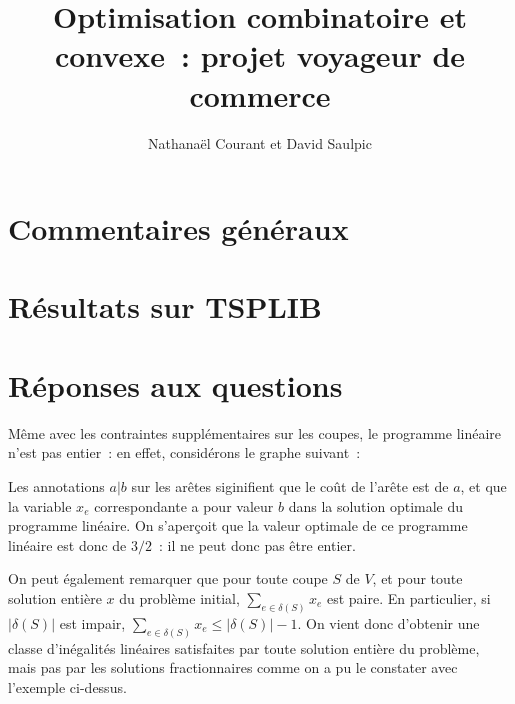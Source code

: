 \documentclass[a4paper,10pt]{article}
\title{Optimisation combinatoire et convexe~: projet voyageur de commerce}
\author{Nathanaël Courant et David Saulpic}
\date{}
\begin{document}
\maketitle

\section{Commentaires généraux}

\section{Résultats sur TSPLIB}

\section{Réponses aux questions}

Même avec les contraintes supplémentaires sur les coupes, le programme linéaire n'est pas entier~: en effet, considérons le graphe suivant~:

\begin {center}
\end{center}

Les annotations $a|b$ sur les arêtes siginifient que le coût de l'arête est de $a$, et que la variable $x_e$ correspondante a pour valeur $b$ dans la solution optimale du programme linéaire. On s'aperçoit que la valeur optimale de ce programme linéaire est donc de $3/2$~: il ne peut donc pas être entier.

On peut également remarquer que pour toute coupe $S$ de $V$, et pour toute solution entière $x$ du problème initial, $\sum_{e\in\delta(S)} x_e$ est paire. En particulier, si $|\delta(S)|$ est impair, $\sum_{e\in\delta(S)} x_e \leq |\delta(S)| - 1$. On vient donc d'obtenir une classe d'inégalités linéaires satisfaites par toute solution entière du problème, mais pas par les solutions fractionnaires comme on a pu le constater avec l'exemple ci-dessus.
\end{document}
